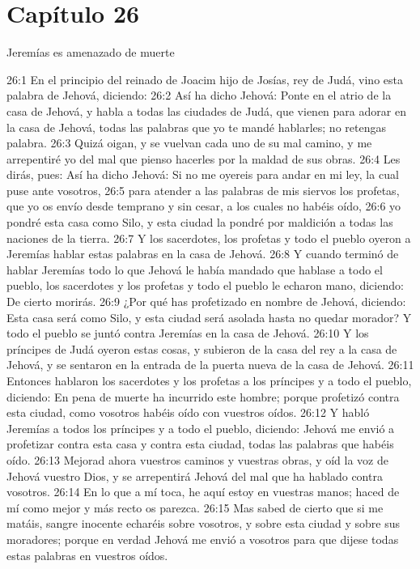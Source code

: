 \section*{Capítulo 26 }
Jeremías es amenazado de muerte 
 
26:1 En el principio del reinado de Joacim hijo de Josías, rey de Judá, vino esta palabra de Jehová, diciendo: 
26:2 Así ha dicho Jehová: Ponte en el atrio de la casa de Jehová, y habla a todas las ciudades de Judá, que vienen para adorar en la casa de Jehová, todas las palabras que yo te mandé hablarles; no retengas palabra. 
26:3 Quizá oigan, y se vuelvan cada uno de su mal camino, y me arrepentiré yo del mal que pienso hacerles por la maldad de sus obras. 
26:4 Les dirás, pues: Así ha dicho Jehová: Si no me oyereis para andar en mi ley, la cual puse ante vosotros, 
26:5 para atender a las palabras de mis siervos los profetas, que yo os envío desde temprano y sin cesar, a los cuales no habéis oído, 
26:6 yo pondré esta casa como Silo, y esta ciudad la pondré por maldición a todas las naciones de la tierra. 
26:7 Y los sacerdotes, los profetas y todo el pueblo oyeron a Jeremías hablar estas palabras en la casa de Jehová. 
26:8 Y cuando terminó de hablar Jeremías todo lo que Jehová le había mandado que hablase a todo el pueblo, los sacerdotes y los profetas y todo el pueblo le echaron mano, diciendo: De cierto morirás. 
26:9 ¿Por qué has profetizado en nombre de Jehová, diciendo: Esta casa será como Silo, y esta ciudad será asolada hasta no quedar morador? Y todo el pueblo se juntó contra Jeremías en la casa de Jehová. 
26:10 Y los príncipes de Judá oyeron estas cosas, y subieron de la casa del rey a la casa de Jehová, y se sentaron en la entrada de la puerta nueva de la casa de Jehová. 
26:11 Entonces hablaron los sacerdotes y los profetas a los príncipes y a todo el pueblo, diciendo: En pena de muerte ha incurrido este hombre; porque profetizó contra esta ciudad, como vosotros habéis oído con vuestros oídos. 
26:12 Y habló Jeremías a todos los príncipes y a todo el pueblo, diciendo: Jehová me envió a profetizar contra esta casa y contra esta ciudad, todas las palabras que habéis oído. 
26:13 Mejorad ahora vuestros caminos y vuestras obras, y oíd la voz de Jehová vuestro Dios, y se arrepentirá Jehová del mal que ha hablado contra vosotros. 
26:14 En lo que a mí toca, he aquí estoy en vuestras manos; haced de mí como mejor y más recto os parezca. 
26:15 Mas sabed de cierto que si me matáis, sangre inocente echaréis sobre vosotros, y sobre esta ciudad y sobre sus moradores; porque en verdad Jehová me envió a vosotros para que dijese todas estas palabras en vuestros oídos. 
